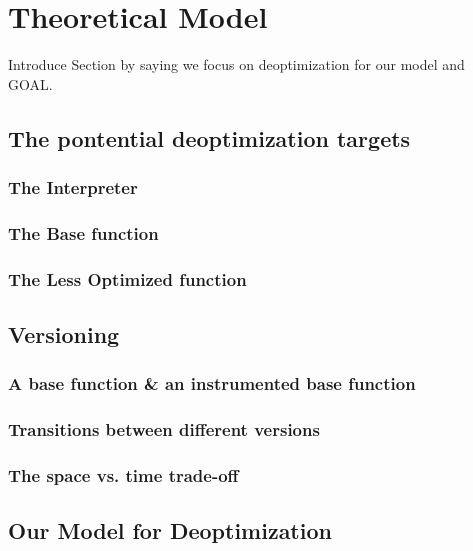 
\chapter{Theoretical Model} %

\label{Chapter3} %


\newcommand{\keyword}[1]{\textbf{#1}}
\newcommand{\tabhead}[1]{\textbf{#1}}
\newcommand{\code}[1]{\texttt{#1}}
\newcommand{\file}[1]{\texttt{\bfseries#1}}
\newcommand{\option}[1]{\texttt{\itshape#1}}


Introduce Section by saying we focus on deoptimization for our model and GOAL.
\section{The pontential deoptimization targets}
\subsection{The Interpreter}
\subsection{The Base function}
\subsection{The Less Optimized function}

\section{Versioning}
\subsection{A base function \& an instrumented base function}

\subsection{Transitions between different versions}

\subsection{The space vs. time trade-off}

\section{Our Model for Deoptimization}